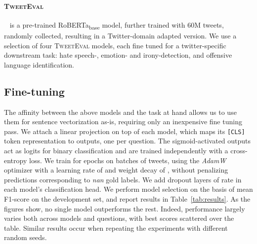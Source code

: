 \documentclass[11pt,a4paper]{article}
\begin{document}
\paragraph{\textsc{TweetEval}}~\cite{cardiff} is a pre-trained RoBERTa\textsubscript{base} model, further trained with 60M tweets, randomly collected, resulting in a Twitter-domain adapted version. 
We use a selection of four \textsc{TweetEval} models, each fine tuned for a twitter-specific downstream task: hate speech-, emotion- and irony-detection, and offensive language identification.


\subsection{Fine-tuning}
The affinity between the above models and the task at hand allows us to use them for sentence vectorization as-is, requiring only an inexpensive fine tuning pass.
We attach a linear projection on top of each model, which maps its \texttt{[CLS]} token representation to  outputs, one per question.
The sigmoid-activated outputs act as logits for binary classification and are trained independently with a cross-entropy loss.
We train for  epochs on batches of  tweets, using the \textit{AdamW}~\cite{adamw} optimizer with a learning rate of  and weight decay of , without penalizing predictions corresponding to \textit{nan} gold labels.
We add dropout layers of rate  in each model's classification head.
We perform model selection on the basis of mean F1-score on the development set, and report results in Table~\ref{tab:results}.
As the figures show, no single model outperforms the rest.
Indeed, performance largely varies both across models and questions, with best scores scattered over the table. Similar results occur when repeating the experiments with different random seeds.
\end{document}
